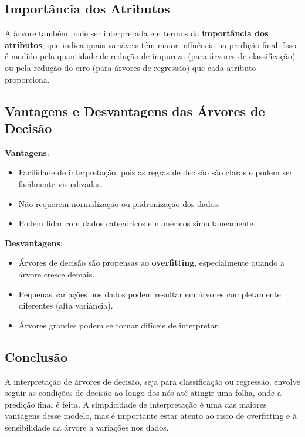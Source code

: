 \documentclass{sciposter}
\begin{document}
\begin{multicols}{3}
\subsection{Importância dos Atributos}

A árvore também pode ser interpretada em termos da \textbf{importância dos atributos}, que indica quais variáveis têm maior influência na predição final. Isso é medido pela quantidade de redução de impureza (para árvores de classificação) ou pela redução do erro (para árvores de regressão) que cada atributo proporciona.

\subsection{Vantagens e Desvantagens das Árvores de Decisão}

\textbf{Vantagens}:
\begin{itemize}
    \item Facilidade de interpretação, pois as regras de decisão são claras e podem ser facilmente visualizadas.
    \item Não requerem normalização ou padronização dos dados.
    \item Podem lidar com dados categóricos e numéricos simultaneamente.
\end{itemize}

\textbf{Desvantagens}:
\begin{itemize}
    \item Árvores de decisão são propensas ao \textbf{overfitting}, especialmente quando a árvore cresce demais.
    \item Pequenas variações nos dados podem resultar em árvores completamente diferentes (alta variância).
    \item Árvores grandes podem se tornar difíceis de interpretar.
\end{itemize}

\subsection{Conclusão}

A interpretação de árvores de decisão, seja para classificação ou regressão, envolve seguir as condições de decisão ao longo dos nós até atingir uma folha, onde a predição final é feita. A simplicidade de interpretação é uma das maiores vantagens desse modelo, mas é importante estar atento ao risco de overfitting e à sensibilidade da árvore a variações nos dados.


\end{multicols}
\end{document}
